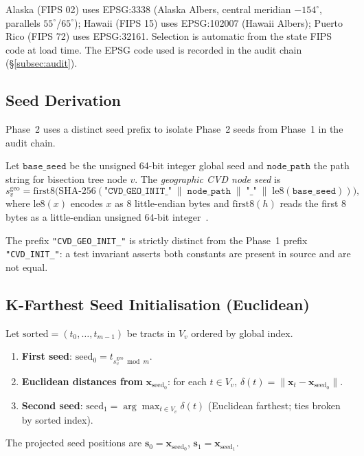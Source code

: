 \begin{remark}
Alaska (FIPS 02) uses EPSG:3338 (Alaska Albers, central meridian $-154^{\circ}$,
parallels $55^{\circ}$/$65^{\circ}$); Hawaii (FIPS 15) uses EPSG:102007
(Hawaii Albers); Puerto Rico (FIPS 72) uses EPSG:32161.
Selection is automatic from the state FIPS code at load time.
The EPSG code used is recorded in the audit chain (\S\ref{subsec:audit}).
\end{remark}

\subsection{Seed Derivation}

Phase~2 uses a distinct seed prefix to isolate Phase~2 seeds from Phase~1
in the audit chain.

\begin{definition}
\label{def:geo-seed}
Let $\mathtt{base\_seed}$ be the unsigned 64-bit integer global seed and
$\mathtt{node\_path}$ the path string for bisection tree node $v$.
The \emph{geographic CVD node seed} is
\[
  s_v^{\mathrm{geo}} = \mathrm{first8}\bigl(
    \mathrm{SHA\text{-}256}(
      \texttt{"CVD\_GEO\_INIT\_"} \;\|\; \mathtt{node\_path}
      \;\|\; \texttt{"\_"} \;\|\; \mathrm{le8}(\mathtt{base\_seed})
    )
  \bigr),
\]
where $\mathrm{le8}(x)$ encodes $x$ as 8 little-endian bytes and
$\mathrm{first8}(h)$ reads the first 8 bytes as a little-endian
unsigned 64-bit integer~\citep{sha256nist}.
\end{definition}

The prefix \texttt{"CVD\_GEO\_INIT\_"} is strictly distinct from the Phase~1
prefix \texttt{"CVD\_INIT\_"}: a test invariant asserts both constants are
present in source and are not equal.

\subsection{K-Farthest Seed Initialisation (Euclidean)}

\begin{definition}
\label{def:geo-kfarthest}
Let $\mathrm{sorted} = (t_0,\ldots,t_{m-1})$ be tracts in $V_v$ ordered by
global index.
\begin{enumerate}
\item \textbf{First seed}: $\mathrm{seed}_0 = t_{s_v^{\mathrm{geo}} \bmod m}$.
\item \textbf{Euclidean distances from} $\mathbf{x}_{\mathrm{seed}_0}$:
  for each $t \in V_v$, $\delta(t) = \|\mathbf{x}_t - \mathbf{x}_{\mathrm{seed}_0}\|$.
\item \textbf{Second seed}: $\mathrm{seed}_1 = \arg\max_{t \in V_v} \delta(t)$
  (Euclidean farthest; ties broken by sorted index).
\end{enumerate}
The projected seed positions are $\mathbf{s}_0 = \mathbf{x}_{\mathrm{seed}_0}$,
$\mathbf{s}_1 = \mathbf{x}_{\mathrm{seed}_1}$.
\end{definition}

